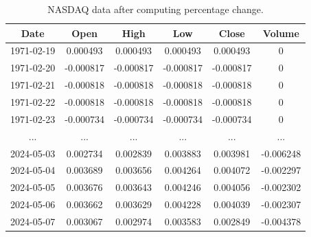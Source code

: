 \begin{table}[H]
	\centering
	\caption{NASDAQ data after computing percentage change.}
	\begin{tabular}{|c|c|c|c|c|c|}
		\hline
		\textbf{Date} & \textbf{Open} & \textbf{High} & \textbf{Low} & \textbf{Close} & \textbf{Volume} \\
		\hline
		1971-02-19    & 0.000493      & 0.000493      & 0.000493     & 0.000493       & 0               \\
		\hline
		1971-02-20    & -0.000817     & -0.000817     & -0.000817    & -0.000817      & 0               \\
		\hline
		1971-02-21    & -0.000818     & -0.000818     & -0.000818    & -0.000818      & 0               \\
		\hline
		1971-02-22    & -0.000818     & -0.000818     & -0.000818    & -0.000818      & 0               \\
		\hline
		1971-02-23    & -0.000734     & -0.000734     & -0.000734    & -0.000734      & 0               \\
		\hline
		...           & ...           & ...           & ...          & ...            & ...             \\
		\hline
		2024-05-03    & 0.002734      & 0.002839      & 0.003883     & 0.003981       & -0.006248       \\
		\hline
		2024-05-04    & 0.003689      & 0.003656      & 0.004264     & 0.004072       & -0.002297       \\
		\hline
		2024-05-05    & 0.003676      & 0.003643      & 0.004246     & 0.004056       & -0.002302       \\
		\hline
		2024-05-06    & 0.003662      & 0.003629      & 0.004228     & 0.004039       & -0.002307       \\
		\hline
		2024-05-07    & 0.003067      & 0.002974      & 0.003583     & 0.002849       & -0.004378       \\
		\hline
	\end{tabular}
	\label{tab:pct-data}
\end{table}

